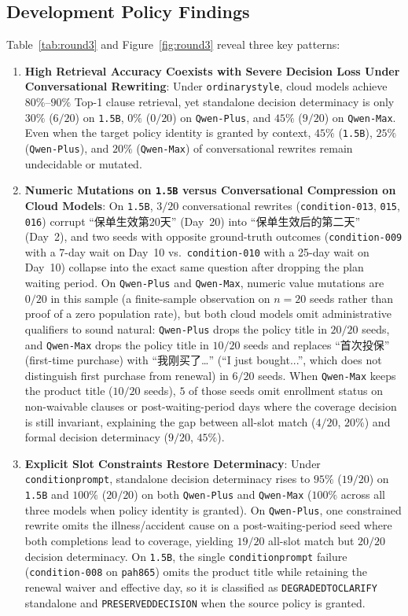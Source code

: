 \documentclass[10pt,twocolumn]{article}
\renewcommand{\_}{\textunderscore\allowbreak}
\begin{document}
\subsection{Development Policy Findings}
Table~\ref{tab:round3} and Figure~\ref{fig:round3} reveal three key patterns:
\begin{enumerate}[leftmargin=*,nosep]
  \item \textbf{High Retrieval Accuracy Coexists with Severe Decision Loss Under Conversational Rewriting}: Under \texttt{ordinary\_style}, cloud models achieve $80\%\text{--}90\%$ Top-1 clause retrieval, yet standalone decision determinacy is only $30\%$ ($6/20$) on \texttt{1.5B}, $0\%$ ($0/20$) on \texttt{Qwen-Plus}, and $45\%$ ($9/20$) on \texttt{Qwen-Max}. Even when the target policy identity is granted by context, $45\%$ (\texttt{1.5B}), $25\%$ (\texttt{Qwen-Plus}), and $20\%$ (\texttt{Qwen-Max}) of conversational rewrites remain undecidable or mutated.
  \item \textbf{Numeric Mutations on \texttt{1.5B} versus Conversational Compression on Cloud Models}: On \texttt{1.5B}, $3/20$ conversational rewrites (\texttt{condition-013}, \texttt{015}, \texttt{016}) corrupt ``保单生效第20天'' (Day~20) into ``保单生效后的第二天'' (Day~2), and two seeds with opposite ground-truth outcomes (\texttt{condition-009} with a 7-day wait on Day~10 vs.\ \texttt{condition-010} with a 25-day wait on Day~10) collapse into the exact same question after dropping the plan waiting period. On \texttt{Qwen-Plus} and \texttt{Qwen-Max}, numeric value mutations are $0/20$ in this sample (a finite-sample observation on $n=20$ seeds rather than proof of a zero population rate), but both cloud models omit administrative qualifiers to sound natural: \texttt{Qwen-Plus} drops the policy title in $20/20$ seeds, and \texttt{Qwen-Max} drops the policy title in $10/20$ seeds and replaces ``首次投保'' (first-time purchase) with ``我刚买了…'' (``I just bought...'', which does not distinguish first purchase from renewal) in $6/20$ seeds. When \texttt{Qwen-Max} keeps the product title ($10/20$ seeds), $5$ of those seeds omit enrollment status on non-waivable clauses or post-waiting-period days where the coverage decision is still invariant, explaining the gap between all-slot match ($4/20$, $20\%$) and formal decision determinacy ($9/20$, $45\%$).
  \item \textbf{Explicit Slot Constraints Restore Determinacy}: Under \texttt{condition\_prompt}, standalone decision determinacy rises to $95\%$ ($19/20$) on \texttt{1.5B} and $100\%$ ($20/20$) on both \texttt{Qwen-Plus} and \texttt{Qwen-Max} ($100\%$ across all three models when policy identity is granted). On \texttt{Qwen-Plus}, one constrained rewrite omits the illness/accident cause on a post-waiting-period seed where both completions lead to coverage, yielding $19/20$ all-slot match but $20/20$ decision determinacy. On \texttt{1.5B}, the single \texttt{condition\_prompt} failure (\texttt{condition-008} on \texttt{pa\_h865}) omits the product title while retaining the renewal waiver and effective day, so it is classified as \texttt{DEGRADED\_TO\_CLARIFY} standalone and \texttt{PRESERVED\_DECISION} when the source policy is granted.
\end{enumerate}
\end{document}
